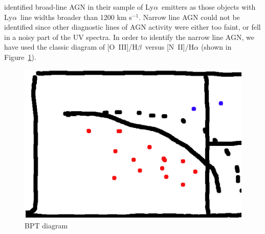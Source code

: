 \documentclass[manuscript]{emulateapj}
\newcommand{\lya}{Ly$\alpha$}
\newcommand{\ha}{H$\alpha$}
\newcommand{\hb}{H$\beta$}
\newcommand{\oiii}{[O~{\small III}]}
\newcommand{\civ}{C~{\small IV}}
\newcommand{\ciii}{[C~{\small III]}}
\newcommand{\nii}{[N~{\small II]}}
\newcommand{\kms}{km s$^{-1}$}
\begin{document}
\citet{deharveng2008} identified broad-line AGN in their sample of
\lya\ emitters as those objects with \lya\ line widths broader than
1200 \kms. Narrow line AGN could not be identified since other
diagnostic lines of AGN activity %
were either too faint, or fell in a noisy part of the UV spectra.  In
order to identify the narrow line AGN, we have used the classic
\citet[][BPT]{baldwin1981} diagram of \oiii/\hb\ versus \nii/\ha
(shown in Figure~\ref{fig:bpt}).

\begin{figure}[h!]
  \centering
  \includegraphics[scale=0.36]{bpt.ps}
  \caption{BPT diagram }
  \label{fig:bpt}
\end{figure}



\end{document}
